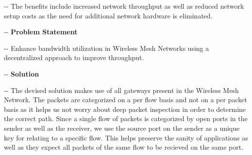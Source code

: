 \documentclass[12pt]{article}
\makeatletter
\newenvironment{indentation}[3]%
	{\par\setlength{\parindent}{#3}
	\setlength{\leftmargin}{#1}       \setlength{\rightmargin}{#1}%
	\advance\linewidth -\leftmargin       \advance\linewidth -\rightmargin%
	\advance\@totalleftmargin\leftmargin  \@setpar{{\@@par}}%
	\parshape 1\@totalleftmargin \linewidth\ignorespaces}{\par}%
\makeatother
\begin{document}
\begin{indentation}{0pt}{0pt}{0pt}
{\normalsize \hspace{1cm}The benefits include increased network throughput as well as reduced network setup costs as the need for additional network hardware is eliminated.}
\end{indentation}
\pagebreak

\begin{indentation}{0pt}{0pt}{0pt}
\vspace{1cm}
\textbf{{{\Large Problem Statement}}}
\end{indentation}
\vspace{0.5cm}

\begin{indentation}{0pt}{0pt}{0pt}
{\normalsize \hspace{1cm} Enhance bandwidth utilization in Wireless Mesh Networks using a decentralized approach to improve throughput.}
\end{indentation}

\begin{indentation}{0pt}{0pt}{0pt}
\vspace{1cm}
\textbf{{{\Large Solution}}}
\end{indentation}
\vspace{0.5cm}
\begin{indentation}{0pt}{0pt}{0pt}
{\normalsize \hspace{1cm} The devised solution makes use of all gateways present in the Wireless Mesh Network. The packets are categorized on a per flow basis and not on a per packet basis as it helps us not worry about deep packet inspection in order to determine the correct path. Since a single flow of packets is categorized by open ports in the sender as well as the receiver, we use the source port on the sender as a unique key for relating to a specific flow. This helps preserve the sanity of applications as well as they expect all packets of the same flow to be recieved on the same port.}
\end{indentation}
\end{document}
